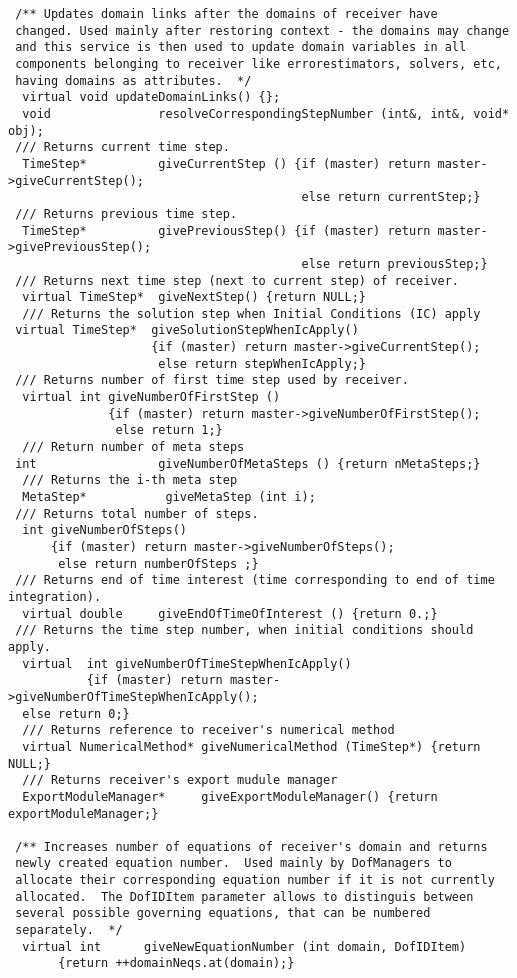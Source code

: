 \documentclass[12pt,draft]{article}
\begin{document}
{\begin{verbatim}
 /** Updates domain links after the domains of receiver have
 changed. Used mainly after restoring context - the domains may change
 and this service is then used to update domain variables in all
 components belonging to receiver like errorestimators, solvers, etc,
 having domains as attributes.  */
  virtual void updateDomainLinks() {};
  void               resolveCorrespondingStepNumber (int&, int&, void* obj);
 /// Returns current time step.
  TimeStep*          giveCurrentStep () {if (master) return master->giveCurrentStep(); 
                                         else return currentStep;}
 /// Returns previous time step.
  TimeStep*          givePreviousStep() {if (master) return master->givePreviousStep(); 
                                         else return previousStep;}
 /// Returns next time step (next to current step) of receiver.
  virtual TimeStep*  giveNextStep() {return NULL;}
  /// Returns the solution step when Initial Conditions (IC) apply
 virtual TimeStep*  giveSolutionStepWhenIcApply() 
                    {if (master) return master->giveCurrentStep(); 
                     else return stepWhenIcApply;}
 /// Returns number of first time step used by receiver.
  virtual int giveNumberOfFirstStep () 
              {if (master) return master->giveNumberOfFirstStep();
               else return 1;}
  /// Return number of meta steps
 int                 giveNumberOfMetaSteps () {return nMetaSteps;}
  /// Returns the i-th meta step
  MetaStep*           giveMetaStep (int i);
 /// Returns total number of steps.
  int giveNumberOfSteps() 
      {if (master) return master->giveNumberOfSteps(); 
       else return numberOfSteps ;}
 /// Returns end of time interest (time corresponding to end of time integration).
  virtual double     giveEndOfTimeOfInterest () {return 0.;}
 /// Returns the time step number, when initial conditions should apply.
  virtual  int giveNumberOfTimeStepWhenIcApply() 
           {if (master) return master->giveNumberOfTimeStepWhenIcApply(); 
  else return 0;}
  /// Returns reference to receiver's numerical method
  virtual NumericalMethod* giveNumericalMethod (TimeStep*) {return NULL;}
  /// Returns receiver's export mudule manager
  ExportModuleManager*     giveExportModuleManager() {return exportModuleManager;}

 /** Increases number of equations of receiver's domain and returns
 newly created equation number.  Used mainly by DofManagers to
 allocate their corresponding equation number if it is not currently
 allocated.  The DofIDItem parameter allows to distinguis between
 several possible governing equations, that can be numbered
 separately.  */
  virtual int      giveNewEquationNumber (int domain, DofIDItem) 
       {return ++domainNeqs.at(domain);}


\end{verbatim}}
\end{document}
